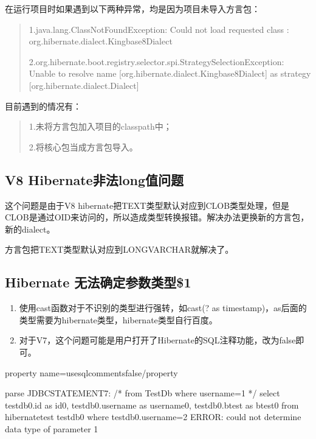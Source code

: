 \documentclass[letterpaper,10pt,english]{sphinxmanual}
\begin{document}
在运行项目时如果遇到以下两种异常，均是因为项目未导入方言包：
\begin{quote}

1.java.lang.ClassNotFoundException: Could not load requested class : org.hibernate.dialect.Kingbase8Dialect

2.org.hibernate.boot.registry.selector.spi.StrategySelectionException: Unable to resolve name {[}org.hibernate.dialect.Kingbase8Dialect{]} as strategy {[}org.hibernate.dialect.Dialect{]}
\end{quote}

目前遇到的情况有：
\begin{quote}

1.未将方言包加入项目的classpath中；

2.将核心包当成方言包导入。
\end{quote}


\subsection{V8 Hibernate非法long值问题}
\label{\detokenize{interface/hibernate:v8-hibernatelong}}
这个问题是由于V8 hibernate把TEXT类型默认对应到CLOB类型处理，但是CLOB是通过OID来访问的，所以造成类型转换报错。解决办法更换新的方言包，新的dialect。

方言包把TEXT类型默认对应到LONGVARCHAR就解决了。


\subsection{Hibernate 无法确定参数类型\$1}
\label{\detokenize{interface/hibernate:hibernate-1}}\begin{enumerate}
%
\item {} 
使用cast函数对于不识别的类型进行强转，如cast(? as timestamp)，as后面的类型需要为hibernate类型，hibernate类型自行百度。

\item {} 
对于V7，这个问题可能是用户打开了Hibernate的SQL注释功能，改为false即可。

\end{enumerate}

\begin{sphinxVerbatim}[commandchars=\\\{\}]
\PYGZlt{}property name=\PYGZdq{}use\PYGZus{}sql\PYGZus{}comments\PYGZdq{}\PYGZgt{}false\PYGZlt{}/property\PYGZgt{}

parse JDBC\PYGZus{}STATEMENT\PYGZus{}7: /* from TestDb  where username=\PYGZdl{}1 */ select testdb0\PYGZus{}.id as id0\PYGZus{}, testdb0\PYGZus{}.username as username0\PYGZus{}, testdb0\PYGZus{}.btest as btest0\PYGZus{} from hibernate\PYGZus{}test testdb0\PYGZus{} where testdb0\PYGZus{}.username=\PYGZdl{}2
ERROR:  could not determine data type of parameter \PYGZdl{}1
\end{sphinxVerbatim}
\end{document}
